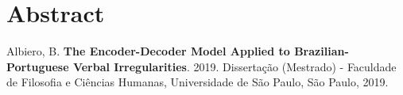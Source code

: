 \documentclass[12pt,twoside,a4paper]{book}
\newcommand{\aup}{\textsuperscript}
\begin{document}


\chapter*{Abstract}
\noindent Albiero, B. \textbf{The Encoder-Decoder Model Applied to Brazilian-Portuguese Verbal Irregularities}. 
2019.
Dissertação (Mestrado) - Faculdade de Filosofia e Ciências Humanas,
Universidade de São Paulo, São Paulo, 2019.
\\
\end{document}
